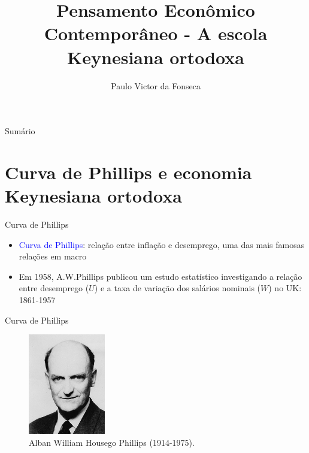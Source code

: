 \documentclass[10pt]{beamer}
\title[]{Pensamento Econômico Contemporâneo - A escola Keynesiana ortodoxa}
\author[]{Paulo Victor da Fonseca}
\date{}
\begin{document}
\begin{frame}[plain]
\end{frame}

\begin{frame}{Sumário}
    \tableofcontents
\end{frame}

\section{Curva de Phillips e economia Keynesiana ortodoxa}
\begin{frame}{Curva de Phillips}
    \begin{itemize}
        \item \textcolor{blue}{Curva de Phillips}: relação entre inflação e desemprego, uma das mais famosas relações em macro
        \bigskip
        \item Em 1958, A.W.Phillips publicou um estudo estatístico investigando a relação entre desemprego ($U$) e a taxa de variação dos salários nominais ($W$) no UK: 1861-1957
    \end{itemize}
\end{frame}

\begin{frame}{Curva de Phillips}
    \begin{figure}
        \centering
        \includegraphics[width=0.3\textwidth]{./figures/aula8_fig1.jpg}
        \caption{Alban William Housego Phillips (1914-1975).}
        \label{fig:phillips}
    \end{figure}
\end{frame}
\end{document}
